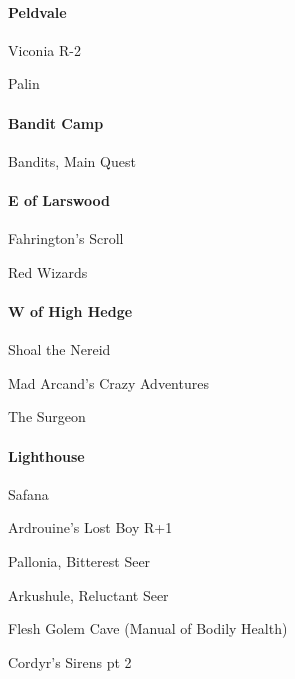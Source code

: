 \documentclass[10pt,a4,twoside]{book}
\begin{document}
\begin{multicols}{3}
\paragraph*{Peldvale}
\begin{trivlist}
\item Viconia \textcolor{Mahogany}{R-2}
\item Palin
\end{trivlist}

\paragraph*{Bandit Camp}
\begin{trivlist}
\item Bandits, Main Quest
\end{trivlist}

\paragraph*{E of Larswood}
\begin{trivlist}
\item Fahrington's Scroll
\item Red Wizards
\end{trivlist}

\paragraph*{W of High Hedge}
\begin{trivlist}
\item Shoal the Nereid
\item Mad Arcand's Crazy Adventures
\item The Surgeon
\end{trivlist}

\paragraph*{Lighthouse}
\begin{trivlist}
\item Safana
\item Ardrouine's Lost Boy {\textcolor{OliveGreen}{R+1}}
\item Pallonia, Bitterest Seer
\item Arkushule, Reluctant Seer
\item Flesh Golem Cave (Manual of Bodily Health)
\item Cordyr's Sirens pt 2  \label{sirines} %
\end{trivlist}


\end{multicols}
\end{document}
